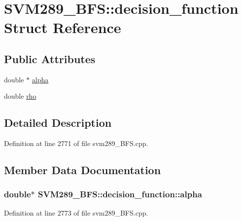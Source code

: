 \hypertarget{struct_s_v_m289___b_f_s_1_1decision__function}{}\section{S\+V\+M289\+\_\+\+B\+FS\+:\+:decision\+\_\+function Struct Reference}
\label{struct_s_v_m289___b_f_s_1_1decision__function}
\subsection*{Public Attributes}
\begin{DoxyCompactItemize}
\item 
double $\ast$ \hyperlink{struct_s_v_m289___b_f_s_1_1decision__function_a8f8ce247bffd8c152d442efd05589046}{alpha}
\item 
double \hyperlink{struct_s_v_m289___b_f_s_1_1decision__function_a0222d06bf34cc9738dd7c66585b6f5d8}{rho}
\end{DoxyCompactItemize}


\subsection{Detailed Description}


Definition at line 2771 of file svm289\+\_\+\+B\+F\+S.\+cpp.



\subsection{Member Data Documentation}
\subsubsection[{\texorpdfstring{alpha}{alpha}}]{\setlength{\rightskip}{0pt plus 5cm}double$\ast$ S\+V\+M289\+\_\+\+B\+F\+S\+::decision\+\_\+function\+::alpha}\hypertarget{struct_s_v_m289___b_f_s_1_1decision__function_a8f8ce247bffd8c152d442efd05589046}{}\label{struct_s_v_m289___b_f_s_1_1decision__function_a8f8ce247bffd8c152d442efd05589046}


Definition at line 2773 of file svm289\+\_\+\+B\+F\+S.\+cpp.



